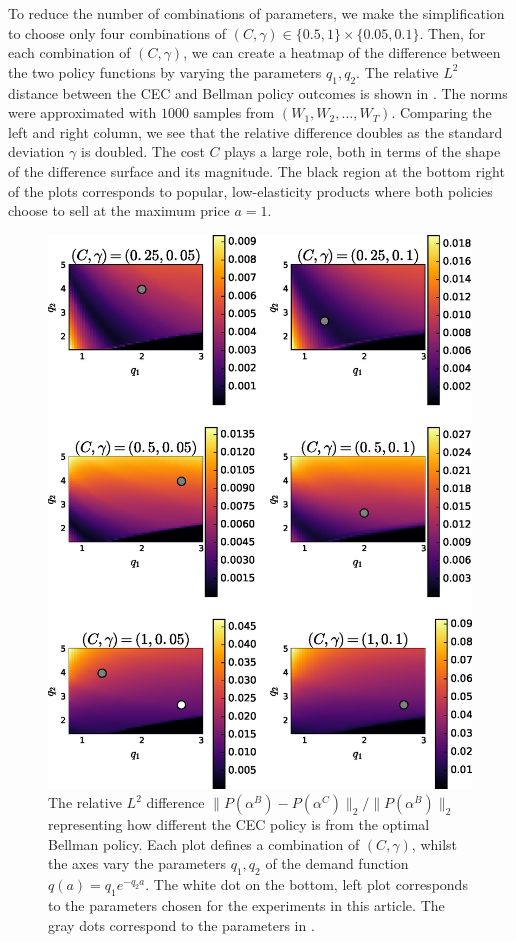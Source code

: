 \documentclass{rsproca_new}
\theoremstyle{definition}
\begin{document}
To reduce the number of combinations of parameters, we make the
simplification to choose only
four combinations of
$(C,\gamma)\in\{0.5,1\}\times\{0.05,0.1\}$.
Then,
for each combination of $(C,\gamma)$,
we can create a heatmap of the difference between the two policy
functions by varying the parameters $q_1,q_2$.
The relative $L^2$ distance between the CEC and Bellman policy outcomes
is shown in . The norms were approximated
with $1000$ samples from $(W_1,W_2,\dots,W_T)$.
Comparing the left and right column, we see that the relative difference doubles as
the standard deviation $\gamma$ is doubled. The cost $C$ plays a large
role, both in terms of the shape of the difference surface and its
magnitude.
The black region at the bottom right of the plots corresponds to popular,
low-elasticity products where both policies choose to sell at the
maximum price $a=1$.
\begin{figure}[htbp]
  \includegraphics[width=\textwidth]{./img/profit_diff_heatmaps}
  \caption{The relative $L^2$ difference
    $\|P(\alpha^B)-P(\alpha^C)\|_2/\|P(\alpha^B)\|_2$ representing
    how different the CEC policy is from the optimal Bellman policy.
    Each plot defines a combination of $(C,\gamma)$, whilst
    the axes vary the parameters $q_1,q_2$ of the demand function
    $q(a)=q_1e^{-q_2a}$.
    The white dot on the bottom, left plot corresponds to the
    parameters chosen for the experiments in this article. The gray
    dots correspond to the parameters in .
  }\label{fig:profit_diff_heatmaps}
\end{figure}
\end{document}
